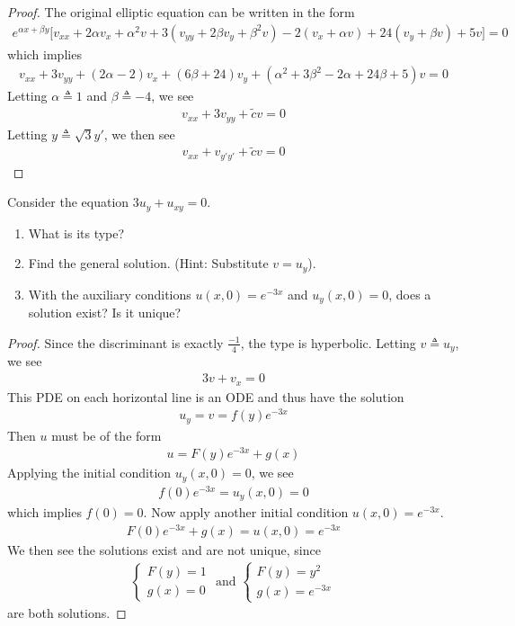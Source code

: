 \documentclass{report}
\begin{document}
\begin{proof}
The original elliptic equation can be written in the form 
\begin{align*}
e^{\alpha x+ \beta  y}\Big[ v_{xx}+2\alpha v_x+ \alpha^2 v +3 (v_{yy}+2\beta  v_y + \beta ^2 v) -2(v_x + \alpha v)+24 (v_y+\beta v)+5v \Big]=0
\end{align*}
which implies 
\begin{align*}
v_{xx}+3v_{yy}+(2\alpha -2)v_x+ (6 \beta  +24)v_y + (\alpha ^2 +3\beta ^2 -2\alpha +24 \beta  +5)v=0 
\end{align*}
Letting $\alpha \triangleq 1$ and $\beta  \triangleq -4$, we see 
\begin{align*}
v_{xx}+3v_{yy}+ \tilde{c}v =0 
\end{align*}
Letting $y\triangleq \sqrt{3}y' $, we then see 
\begin{align*}
v_{xx}+v_{y'y'}+\tilde{c}v=0 
\end{align*}
\end{proof}
\begin{question}{}{}
Consider the equation $3u_y+u_{xy}=0$.
\begin{enumerate}[label=(\alph*)]
  \item What is its type? 
  \item Find the general solution. (Hint: Substitute $v=u_y$).
  \item With the auxiliary conditions $u(x,0)=e^{-3x}$ and $u_{y}(x,0)=0$, does a solution exist? Is it unique? 
\end{enumerate}
\end{question}
\begin{proof}
Since the discriminant is exactly $\frac{-1}{4}$, the type is hyperbolic. Letting $v\triangleq u_y$, we see 
\begin{align*}
3v+v_x=0
\end{align*}
This PDE on each horizontal line is an ODE and thus have the solution 
\begin{align*}
u_y=v=f(y)e^{-3x}
\end{align*}
Then $u$ must be of the form 
\begin{align*}
u=F(y)e^{-3x}+ g(x)
\end{align*}
Applying the initial condition $u_y(x,0)=0$, we see 
\begin{align*}
f(0)e^{-3x}=u_y(x,0)=0
\end{align*}
which implies $f(0)=0$. Now apply another initial condition $u(x,0)=e^{-3x}$. 
\begin{align*}
F(0)e^{-3x}+g(x)=u(x,0)=e^{-3x}
\end{align*}
We then see the solutions exist and are not unique, since 
\begin{align*}
\begin{cases}
  F(y)=1\\
  g(x)=0
\end{cases}\text{ and }\begin{cases}
  F(y)=y^2\\
  g(x)=e^{-3x}
\end{cases}
\end{align*}
are both solutions. 
\end{proof}
\end{document}
